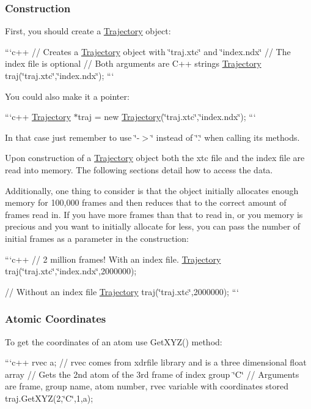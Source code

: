 \subsubsection*{Construction}

First, you should create a \hyperlink{classTrajectory}{Trajectory} object\-:

```c++ // Creates a \hyperlink{classTrajectory}{Trajectory} object with \char`\"{}traj.\-xtc\char`\"{} and \char`\"{}index.\-ndx\char`\"{} // The index file is optional // Both arguments are C++ strings \hyperlink{classTrajectory}{Trajectory} traj(\char`\"{}traj.\-xtc\char`\"{},\char`\"{}index.\-ndx\char`\"{}); ```

You could also make it a pointer\-:

```c++ \hyperlink{classTrajectory}{Trajectory} $\ast$traj = new \hyperlink{classTrajectory}{Trajectory}(\char`\"{}traj.\-xtc\char`\"{},\char`\"{}index.\-ndx\char`\"{}); ```

In that case just remember to use \char`\"{}-\/$>$\char`\"{} instead of \char`\"{}.\char`\"{} when calling its methods.

Upon construction of a \hyperlink{classTrajectory}{Trajectory} object both the xtc file and the index file are read into memory. The following sections detail how to access the data.

Additionally, one thing to consider is that the object initially allocates enough memory for 100,000 frames and then reduces that to the correct amount of frames read in. If you have more frames than that to read in, or you memory is precious and you want to initially allocate for less, you can pass the number of initial frames as a parameter in the construction\-:

```c++ // 2 million frames! With an index file. \hyperlink{classTrajectory}{Trajectory} traj(\char`\"{}traj.\-xtc\char`\"{},\char`\"{}index.\-ndx\char`\"{},2000000);

// Without an index file \hyperlink{classTrajectory}{Trajectory} traj(\char`\"{}traj.\-xtc\char`\"{},2000000); ```

\subsubsection*{Atomic Coordinates}

To get the coordinates of an atom use Get\-X\-Y\-Z() method\-:

```c++ rvec a; // rvec comes from xdrfile library and is a three dimensional float array // Gets the 2nd atom of the 3rd frame of index group \char`\"{}\-C\char`\"{} // Arguments are frame, group name, atom number, rvec variable with coordinates stored traj.\-Get\-X\-Y\-Z(2,\char`\"{}\-C\char`\"{},1,a);

